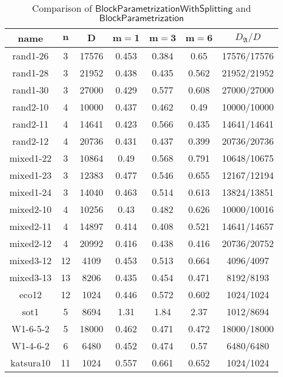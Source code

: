 \documentclass[12pt]{article}
\newcommand{\mainalgoname}{\mathsf{ BlockParametrization}}
\begin{document}
\begin{table}[H]
  \centering
 \def\arraystretch{1.2}
\setlength\tabcolsep{6pt}
	\caption{Comparison of $\mathsf{BlockParametrizationWithSplitting}$ and $\mainalgoname$}
  \label{tbl:comparison_algos}
\begin{tabular}{c|c|c|c|c|c|c}
\textbf{name}& $\bm{n}$ & $\bm{D}$ & $\bm{m = 1}$ & $\bm{m = 3}$ & $\bm{m = 6}$&$D_\mathfrak{A}/D$\\
\hline
rand1-26&3 &17576&0.453&0.384&0.65&17576/17576 \\
rand1-28&3 &21952&0.438&0.435&0.562& 21952/21952\\
rand1-30&3 &27000&0.429&0.577&0.608&27000/27000 \\
rand2-10&4 &10000&0.437&0.462&0.49& 10000/10000\\
rand2-11&4 &14641&0.423&0.566&0.435&14641/14641 \\
rand2-12&4 &20736&0.431&0.437&0.399&20736/20736 \\
mixed1-22&3 &10864&0.49&0.568&0.791& 10648/10675\\
mixed1-23&3 &12383&0.477&0.546&0.655& 12167/12194\\
mixed1-24&3 &14040&0.463&0.514&0.613& 13824/13851\\
mixed2-10&4 &10256&0.43&0.482&0.626& 10000/10016\\
mixed2-11&4 &14897&0.414&0.408&0.521& 14641/14657\\
mixed2-12&4 &20992&0.416&0.438&0.416&20736/20752 \\
mixed3-12&12 &4109&0.453&0.513&0.664& 4096/4097\\
mixed3-13&13 &8206&0.435&0.454&0.471& 8192/8193\\
eco12&12 &1024&0.446&0.572&0.602& 1024/1024\\
sot1&5 &8694&1.31&1.84&2.37& 1012/8694\\
W1-6-5-2&5 &18000&0.462&0.471&0.472& 18000/18000\\
W1-4-6-2&6 &6480&0.452&0.474&0.57& 6480/6480\\
katsura10&11 &1024&0.557&0.661&0.652& 1024/1024
\end{tabular}
\end{table}
\end{document}
